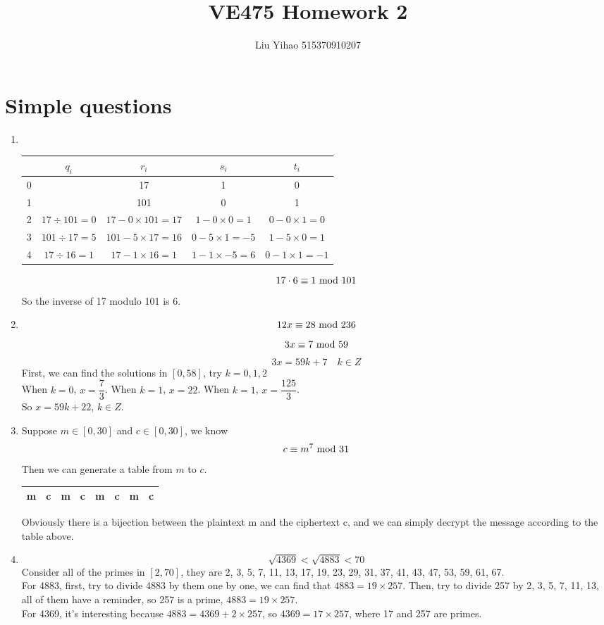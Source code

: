 \documentclass{article}
\title{VE475 Homework 2}
\author{Liu Yihao 515370910207}
\date{}
\renewcommand{\mod}{{\rm\ mod\ }}
\begin{document}
\maketitle

\section{Simple questions}
\begin{enumerate}
\item \ 
\begin{center}
\begin{tabular}{|c|c|c|c|c|}
\hline
& $q_i$ & $r_i$ & $s_i$ & $t_i$\\\hline
0 & & 17 & 1 & 0\\\hline
1 & & 101 & 0 & 1\\\hline
2 & $17\div101=0$ & $17-0\times101=17$ & $1-0\times0=1$ & $0-0\times1=0$\\\hline
3 & $101\div17=5$ & $101-5\times17=16$ & $0-5\times1=-5$ & $1-5\times0=1$\\\hline
4 & $17\div16=1$ & $17-1\times16=1$ & $1-1\times-5=6$ & $0-1\times1=-1$\\\hline
\end{tabular}
\end{center}
$$17\cdot6\equiv1\mod101$$
So the inverse of 17 modulo 101 is 6.

\item
$$12x\equiv28\mod236$$
$$3x\equiv7\mod59$$
$$3x=59k+7\quad k\in Z$$
First, we can find the solutions in $[0,58]$, try $k=0,1,2$\\
When $k=0$, $x=\dfrac{7}{3}$. When $k=1$, $x=22$. When $k=1$, $x=\dfrac{125}{3}$.\\
So $x=59k+22$, $k\in Z$.

\item
Suppose $m\in[0,30]$ and $c\in[0,30]$, we know
$$c\equiv m^7\mod 31$$
Then we can generate a table from $m$ to $c$.
\begin{center}
\begin{tabular}{cc|cc|cc|cc}
m&c&m&c&m&c&m&c\\\hline

\end{tabular}
\end{center}
Obviously there is a bijection between the plaintext m and the ciphertext c, and we can simply decrypt the message according to the table above.

\item
$$\sqrt{4369}<\sqrt{4883}<70$$
Consider all of the primes in $[2,70]$, they are 2, 3, 5, 7, 11, 13, 17, 19, 23, 29, 31, 37, 41, 43, 47, 53, 59, 61, 67.\\
For 4883, first, try to divide 4883 by them one by one, we can find that $4883=19\times 257$. Then, try to divide 257 by 2, 3, 5, 7, 11, 13, all of them have a reminder, so 257 is a prime, $4883=19\times 257$.\\
For 4369, it's interesting because $4883=4369+2\times257$, so $4369=17\times257$, where 17 and 257 are primes.


\end{enumerate}
\end{document}
